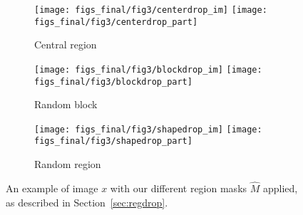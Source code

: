 \documentclass[10pt,twocolumn,letterpaper]{article}
\newcommand{\lblfig}[1]{\label{fig:#1}}
\begin{document}
\begin{figure}[t]
\vspace{-0.5em}
\centering
\begin{subfigure}[b]{0.32\linewidth}
\centering
\texttt{[image: figs\_final/fig3/centerdrop\_im]}
\texttt{[image: figs\_final/fig3/centerdrop\_part]}
\caption{Central region}
\lblfig{drop_random}
\end{subfigure}
\begin{subfigure}[b]{0.32\linewidth}
\centering
\texttt{[image: figs\_final/fig3/blockdrop\_im]}
\texttt{[image: figs\_final/fig3/blockdrop\_part]}
\caption{Random block}
\lblfig{drop_block}
\end{subfigure}
\begin{subfigure}[b]{0.32\linewidth}
\centering
\texttt{[image: figs\_final/fig3/shapedrop\_im]}
\texttt{[image: figs\_final/fig3/shapedrop\_part]}
\caption{Random region}
\lblfig{drop_region}
\end{subfigure}
\vspace{-0.5em}
\caption{An example of image $x$ with our different region masks $\hat M$ applied, as described in Section~\ref{sec:regdrop}.}
\label{fig:regdrop}
\vspace{-0.5em}
\end{figure}
\end{document}
